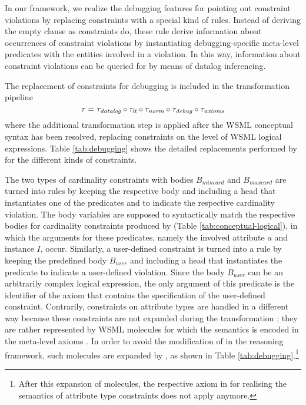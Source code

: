 In our framework, we realize the debugging features for pointing
out constraint violations by replacing constraints with a special
kind of rules. Instead of deriving the empty clause as constraints
do, these rule derive information about occurrences of constraint
violations by instantiating debugging-specific meta-level
predicates with the entities involved in a violation. In this way,
information about constraint violations can be queried for by
means of datalog inferencing.

The replacement of constraints for debugging is included in the
transformation pipeline
\begin{displaymath}
    \tau = \transdlog \circ \translt \circ \transnorm \circ \transdebug \circ \transax
\end{displaymath}
where the additional transformation step \transdebug is applied
after the WSML conceptual syntax has been resolved, replacing
constraints on the level of WSML logical expressions. Table
\ref{tab:debugging} shows the detailed replacements performed by
\transdebug for the different kinds of constraints.

The two types of cardinality constraints with bodies $B_{mincard}$
and $B_{maxcard}$ are turned into rules by keeping the respective
body and including a head that instantiates one of the predicates
\pvmincard and \pvmaxcard to indicate the respective cardinality
violation. The body variables are supposed to syntactically match
the respective bodies for cardinality constraints produced by
\transax (Table \ref{tab:conceptual-logical}), in which the
arguments for these predicates, namely the involved attribute $a$
and instance $I$, occur. Similarly, a user-defined constraint is
turned into a rule by keeping the predefined body $B_{user}$ and
including a head that instantiates the predicate \pvuser to
indicate a user-defined violation. Since the body $B_{user}$ can
be an arbitrarily complex logical expression, the only argument of
this predicate is the identifier \axiomid of the axiom that
contains the  specification of the user-defined constraint.
Contrarily, constraints on attribute types are handled in a
different way because these constraints are not expanded during
the transformation \transax ; they are rather represented by WSML
 molecules for which the semantics is encoded in the
meta-level axioms \mlaxioms. In order to avoid the modification of
\mlaxioms in the reasoning framework, such molecules are expanded
by \transdebug, as shown in Table
\ref{tab:debugging}.\footnote{After this expansion of
 molecules, the respective axiom in \mlaxioms for
realising the semantics of attribute type constraints does not
apply anymore.}

